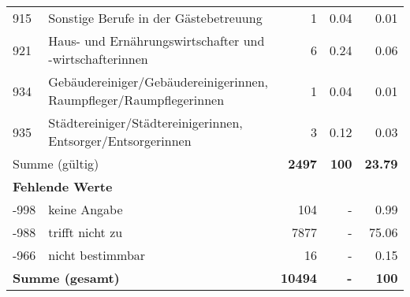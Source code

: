 \begin{longtable}{lXrrr}
        915 & \multicolumn{1}{X}{Sonstige Berufe in der Gästebetreuung} & %
          \num{1} &
          \num[round-mode=places,round-precision=2]{0,04} &
          \num[round-mode=places,round-precision=2]{0,01} \\

        921 & \multicolumn{1}{X}{Haus- und Ernährungswirtschafter und -wirtschafterinnen} & %
          \num{6} &
          \num[round-mode=places,round-precision=2]{0,24} &
          \num[round-mode=places,round-precision=2]{0,06} \\

        934 & \multicolumn{1}{X}{Gebäudereiniger/Gebäudereinigerinnen, Raumpfleger/Raumpflegerinnen} & %
          \num{1} &
          \num[round-mode=places,round-precision=2]{0,04} &
          \num[round-mode=places,round-precision=2]{0,01} \\

        935 & \multicolumn{1}{X}{Städtereiniger/Städtereinigerinnen, Entsorger/Entsorgerinnen} & %
          \num{3} &
          \num[round-mode=places,round-precision=2]{0,12} &
          \num[round-mode=places,round-precision=2]{0,03} \\

     \midrule
     \multicolumn{2}{l}{Summe (gültig)} &
       \textbf{\num{2497}} &
     \textbf{100} &
       \textbf{\num[round-mode=places,round-precision=2]{23,79}} \\
     \multicolumn{5}{l}{\textbf{Fehlende Werte}}\\
       -998 &
       keine Angabe &
         \num{104} &
        - &
         \num[round-mode=places,round-precision=2]{0,99} \\
       -988 &
       trifft nicht zu &
         \num{7877} &
        - &
         \num[round-mode=places,round-precision=2]{75,06} \\
       -966 &
       nicht bestimmbar &
         \num{16} &
        - &
         \num[round-mode=places,round-precision=2]{0,15} \\
     \midrule
     \multicolumn{2}{l}{\textbf{Summe (gesamt)}} &
          \textbf{\num{10494}} &
        \textbf{-} &
        \textbf{100} \\
     \bottomrule
     \end{longtable}
     
